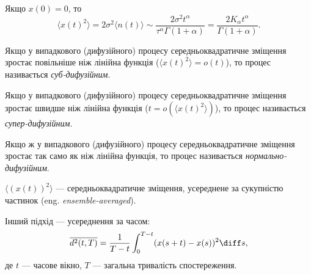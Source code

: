 \begin{corollary}
    Якщо $x(0) = 0$, то
    \begin{equation}
        \langle x(t)^2 \rangle = 2 \sigma^2 \langle n(t) \rangle \sim \frac{2 \sigma^2 t^\alpha}{\tau^\alpha \Gamma(1 + \alpha)} = \frac{2 K_\alpha t^\alpha}{\Gamma(1 + \alpha)}.
    \end{equation}
\end{corollary}

\begin{definition}
    Якщо у випадкового (дифузійного) процесу середньоквадратичне зміщення зростає повільніше ніж лінійна функція ($\langle x(t)^2 \rangle = o(t)$), то процес називається \textit{суб-дифузійним}.
\end{definition}

\begin{definition}
    Якщо у випадкового (дифузійного) процесу середньоквадратичне зміщення зростає швидше ніж лінійна функція ($t = o(\langle x(t)^2 \rangle)$), то процес називається \textit{супер-дифузійним}.
\end{definition}

\begin{definition}
    Якщо ж у випадкового (дифузійного) процесу середньоквадратичне зміщення зростає так само як ніж лінійна функція, то процес називається \textit{нормально-дифузійним}.
\end{definition}

\begin{remark}
    $\langle (x(t))^2 \rangle$ --- середньоквадратичне зміщення, усереднене за сукупністю частинок (eng. \textit{ensemble-averaged}).
\end{remark}

Інший підхід --- усереднення за часом:
\begin{equation}
    \overline{d^2(t, T)} = \frac{1}{T - t} \int_0^{T - t} (x(s + t) - x(s))^2 \diff s,
\end{equation}
де $t$ --- часове вікно, $T$ --- загальна тривалість спостереження.
